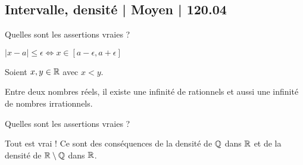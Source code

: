 \subsection{Intervalle, densité | Moyen | 120.04}



\begin{question}

Quelles sont les assertions vraies ?
\begin{answers}



\end{answers}
\begin{explanations}
$|x-a| \le \epsilon \iff x \in [a-\epsilon,a+\epsilon]$
\end{explanations}
\end{question}




\begin{question}

Soient $x,y \in \mathbb{R}$ avec $x<y$.
\begin{answers}



\end{answers}
\begin{explanations}
Entre deux nombres réels, il existe une infinité de rationnels et aussi une infinité de nombres irrationnels.
\end{explanations}
\end{question}


\begin{question}

Quelles sont les assertions vraies ?
\begin{answers}



    
\end{answers}
\begin{explanations}
Tout est vrai ! Ce sont des conséquences de la densité de $\mathbb{Q}$ dans $\mathbb{R}$ et de la densité de $\mathbb{R} \setminus \mathbb{Q}$ dans $\mathbb{R}$.
\end{explanations}
\end{question}

